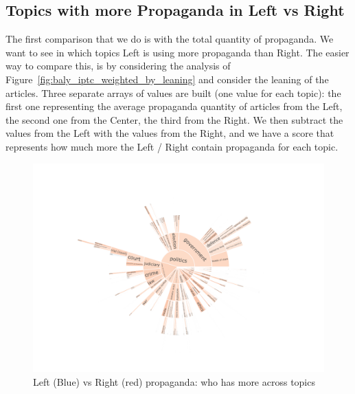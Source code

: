 
\subsection{\statusgreen Topics with more Propaganda in Left vs Right}
\label{ssec:topic_propaganda_leaning_tot_quantity}


The first comparison that we do is with the total quantity of propaganda. We want to see in which topics Left is using more propaganda than Right.
The easier way to compare this, is by considering the analysis of Figure~\ref{fig:baly_iptc_weighted_by_leaning} and consider the leaning of the articles. Three separate arrays of values are built (one value for each topic): the first one representing the average propaganda quantity of articles from the Left, the second one from the Center, the third from the Right.
We then subtract the values from the Left with the values from the Right, and we have a score that represents how much more the Left / Right contain propaganda for each topic.



\begin{figure}[!htbp]
    \centering
    \includegraphics[trim={2.2cm 2cm 2.2cm 2cm},clip,width=\linewidth]{figures/baly_iptc_weighted_prop_total_leaning_diff.pdf}
    \caption{Left (Blue) vs Right (red) propaganda: who has more across topics}
    \label{fig:baly_iptc_weighted_prop_total_leaning_diff}
\end{figure}

